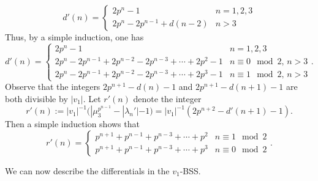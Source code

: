 \[
d'(n) = \begin{cases}
	2p^n-1 & n=1,2,3\\
	2p^n-2p^{n-1}+d(n-2) & n>3
\end{cases}
\]
Thus, by a simple induction, one has 
\[
d'(n) = \begin{cases}
	2p^n-1 & n=1,2,3\\
	2p^n-2p^{n-1}+2p^{n-2}-2p^{n-3}+\cdots + 2p^2-1 & n\equiv 0\mod 2,\, n>3\\
	2p^n-2p^{n-1}+ 2p^{n-2}-2p^{n-3}+\cdots + 2p^3-1& n\equiv 1\mod 2, \, n>3
\end{cases}.
\]
Observe that the integers $2p^{n+1}-d(n)-1$ and $2p^{n+1}-d(n+1)-1$ are both divisible by $|v_1|$. Let $r'(n)$ denote the integer 
\[
r'(n):=|v_1|^{-1}(|\mu_3^{p^{n-1}}-|\lambda_n'|-1)=|v_1|^{-1}(2p^{n+2}-d'(n+1)-1).
\] 
Then a simple induction shows that 
\[
r'(n) = \begin{cases}
	p^{n+1}+p^{n-1}+p^{n-3} +\cdots + p^2 & n\equiv 1 \mod 2\\
	p^{n+1}+p^{n-1}+p^{n-3}+\cdots + p^3 & n\equiv 0 \mod 2
\end{cases}.
\]



We can now describe the differentials in the $v_1$-BSS. 



